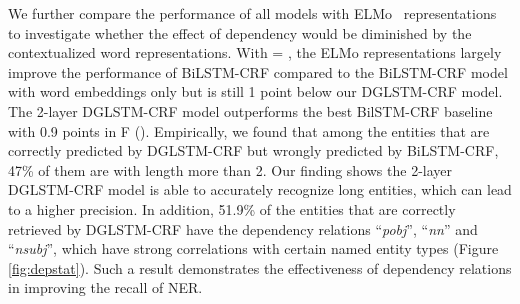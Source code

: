\documentclass[11pt,a4paper]{article}
\begin{document}
We further compare the performance of all models with ELMo~\cite{peters2018deep} representations to investigate whether the effect of dependency would be diminished by the contextualized word representations. 
With  = , the ELMo representations largely improve the performance of BiLSTM-CRF compared to the BiLSTM-CRF model with word embeddings only but is still 1 point below our DGLSTM-CRF model. 
The 2-layer DGLSTM-CRF model outperforms the best BilSTM-CRF baseline with 0.9 points in F ().
Empirically, we found that among the entities that are correctly predicted by DGLSTM-CRF but wrongly predicted by BiLSTM-CRF, 47\% of them are with length more than 2. 
Our finding shows the 2-layer DGLSTM-CRF model is able to accurately recognize long entities, which can lead to a higher precision.  
In addition, 51.9\% of the entities that are correctly retrieved by DGLSTM-CRF have the dependency relations ``\textit{pobj}'', ``\textit{nn}'' and ``\textit{nsubj}'', which have strong correlations with certain named entity types (Figure \ref{fig:depstat}).  
Such a result demonstrates the effectiveness of dependency relations in improving the recall of NER.
\end{document}
